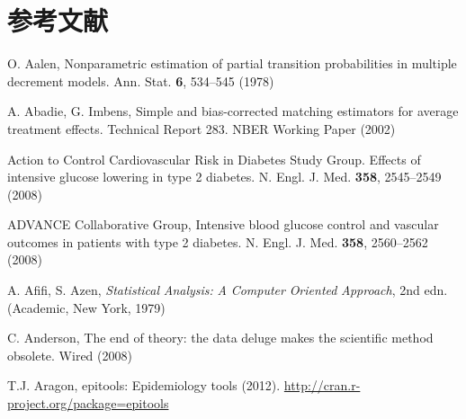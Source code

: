 \chapter*{参考文献}
\begingroup
\small\linespread{1.15}\selectfont
\raggedright\raggedbottom
\setlength{\parskip}{0pt}
\begin{list}{}{\setlength{\leftmargin}{2.1em}\setlength{\labelwidth}{0pt}
  \setlength{\labelsep}{0pt}\setlength{\itemindent}{-2.1em}
  \setlength{\parsep}{0pt}\setlength{\itemsep}{2pt}\setlength{\topsep}{0pt}}
\item\label{refentry:REF001}O. Aalen, Nonparametric estimation of partial transition probabilities in multiple decrement models. Ann. Stat. \textbf{6}, 534--545 (1978)\label{refend:REF001}
\item\label{refentry:REF002}A. Abadie, G. Imbens, Simple and bias-corrected matching estimators for average treatment effects. Technical Report 283. NBER Working Paper (2002)\label{refend:REF002}
\item\label{refentry:REF003}Action to Control Cardiovascular Risk in Diabetes Study Group. Effects of intensive glucose lowering in type 2 diabetes. N. Engl. J. Med. \textbf{358}, 2545--2549 (2008)\label{refend:REF003}
\item\label{refentry:REF004}ADVANCE Collaborative Group, Intensive blood glucose control and vascular outcomes in patients with type 2 diabetes. N. Engl. J. Med. \textbf{358}, 2560--2562 (2008)\label{refend:REF004}
\item\label{refentry:REF005}A. Afifi, S. Azen, \textit{Statistical} \textit{Analysis:} \textit{A} \textit{Computer} \textit{Oriented} \textit{Approach}, 2nd edn. (Academic, New York, 1979)\label{refend:REF005}
\item\label{refentry:REF006}C. Anderson, The end of theory: the data deluge makes the scientific method obsolete. Wired (2008)\label{refend:REF006}
\item\label{refentry:REF007}T.J. Aragon, epitools: Epidemiology tools (2012). \url{http://cran.r-project.org/package=epitools}\label{refend:REF007}

\end{list}
